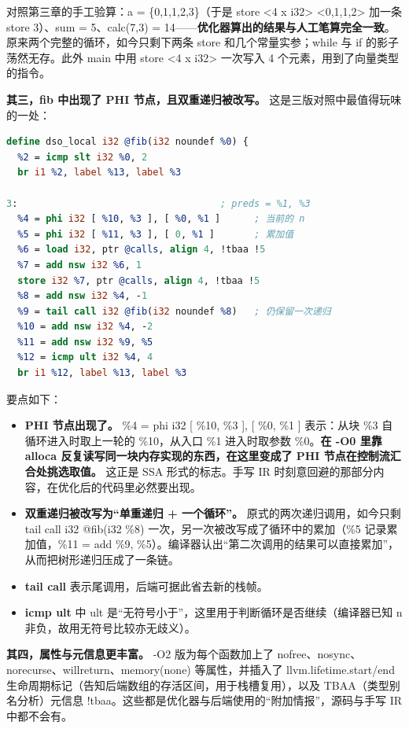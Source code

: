 \documentclass[UTF8,a4paper,10pt]{ctexart}
\begin{document}
对照第三章的手工验算：a = \{0,1,1,2,3\}（于是 store <4 x i32> <0,1,1,2> 加一条 store 3）、sum = 5、calc(7,3) = 14——\textbf{优化器算出的结果与人工笔算完全一致}。原来两个完整的循环，如今只剩下两条 store 和几个常量实参；while 与 if 的影子荡然无存。此外 main 中用 store <4 x i32> 一次写入 4 个元素，用到了向量类型的指令。

\textbf{其三，fib 中出现了 PHI 节点，且双重递归被改写。} 这是三版对照中最值得玩味的一处：

\begin{lstlisting}[language=LLVM]
define dso_local i32 @fib(i32 noundef %0) {
  %2 = icmp slt i32 %0, 2
  br i1 %2, label %13, label %3

3:                                    ; preds = %1, %3
  %4 = phi i32 [ %10, %3 ], [ %0, %1 ]      ; 当前的 n
  %5 = phi i32 [ %11, %3 ], [ 0, %1 ]       ; 累加值
  %6 = load i32, ptr @calls, align 4, !tbaa !5
  %7 = add nsw i32 %6, 1
  store i32 %7, ptr @calls, align 4, !tbaa !5
  %8 = add nsw i32 %4, -1
  %9 = tail call i32 @fib(i32 noundef %8)   ; 仍保留一次递归
  %10 = add nsw i32 %4, -2
  %11 = add nsw i32 %9, %5
  %12 = icmp ult i32 %4, 4
  br i1 %12, label %13, label %3
\end{lstlisting}

要点如下：

\begin{itemize}
  \item \textbf{PHI 节点出现了。} \%4 = phi i32 [ \%10, \%3 ], [ \%0, \%1 ] 表示：从块 \%3 自循环进入时取上一轮的 \%10，从入口 \%1 进入时取参数 \%0。\textbf{在 -O0 里靠 alloca 反复读写同一块内存实现的东西，在这里变成了 PHI 节点在控制流汇合处挑选取值。} 这正是 SSA 形式的标志。手写 IR 时刻意回避的那部分内容，在优化后的代码里必然要出现。
  \item \textbf{双重递归被改写为“单重递归 + 一个循环”。} 原式的两次递归调用，如今只剩 tail call i32 @fib(i32 \%8) 一次，另一次被改写成了循环中的累加（\%5 记录累加值，\%11 = add \%9, \%5）。编译器认出“第二次调用的结果可以直接累加”，从而把树形递归压成了一条链。
  \item \textbf{tail call} 表示尾调用，后端可据此省去新的栈帧。
  \item \textbf{icmp ult} 中 ult 是“无符号小于”，这里用于判断循环是否继续（编译器已知 n 非负，故用无符号比较亦无歧义）。
\end{itemize}

\textbf{其四，属性与元信息更丰富。} -O2 版为每个函数加上了 nofree、nosync、norecurse、willreturn、memory(none) 等属性，并插入了 llvm.lifetime.start/end 生命周期标记（告知后端数组的存活区间，用于栈槽复用），以及 TBAA（类型别名分析）元信息 !tbaa。这些都是优化器与后端使用的“附加情报”，源码与手写 IR 中都不会有。
\end{document}
